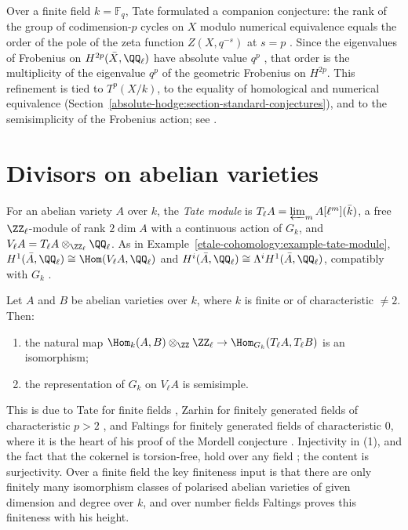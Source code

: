 \begin{remark}\label{absolute-hodge:remark-poles}
Over a finite field $k = \mathbb{F}_q$, Tate formulated a companion conjecture: the rank of the group of codimension-$p$ cycles on $X$ modulo numerical equivalence equals the order of the pole of the zeta
function $Z(X, q^{-s})$ at $s = p$ \cite{tate-1965}. Since the eigenvalues of Frobenius on $H^{2p}(\bar X, \QQ_\ell)$ have absolute value $q^p$ \cite{deligne-weil-1}, that order is the multiplicity of the
eigenvalue $q^p$ of the geometric Frobenius on $H^{2p}$. This refinement is tied to $T^p(X/k)$, to the equality of homological and numerical equivalence (Section~\ref{absolute-hodge:section-standard-conjectures}), and to the
semisimplicity of the Frobenius action; see \cite{totaro-2017}.
\end{remark}

\section{Divisors on abelian varieties}\label{absolute-hodge:section-abelian}

For an abelian variety $A$ over $k$, the \emph{Tate module} is $T_\ell A = \varprojlim_mA[\ell^m](\bar k)$, a free $\ZZ_\ell$-module of rank $2\dim A$ with a continuous action of $G_k$, and
$V_\ell A = T_\ell A \otimes_{\ZZ_\ell}\QQ_\ell$. As in Example~\ref{etale-cohomology:example-tate-module}, $H^1(\bar A, \QQ_\ell) \cong \Hom(V_\ell A, \QQ_\ell)$ and $H^i(\bar A, \QQ_\ell) \cong \Lambda^iH^1(\bar A, \QQ_\ell)$,
compatibly with $G_k$ \cite{milne-etale}.

\begin{theorem}\label{absolute-hodge:theorem-isogeny}
Let $A$ and $B$ be abelian varieties over $k$, where $k$ is finite or of characteristic $\neq 2$. Then:
\begin{enumerate}
\item the natural map $\Hom_k(A, B) \otimes_\ZZ\ZZ_\ell \to \Hom_{G_k}(T_\ell A, T_\ell B)$ is an isomorphism;
\item the representation of $G_k$ on $V_\ell A$ is semisimple.
\end{enumerate}
\end{theorem}

This is due to Tate for finite fields \cite{tate-1966}, Zarhin for finitely generated fields of characteristic $p > 2$ \cite{zarhin-1975}, and Faltings for finitely generated fields of characteristic $0$,
where it is the heart of his proof of the Mordell conjecture \cite{faltings-1983}. Injectivity in (1), and the fact that the cokernel is torsion-free, hold over any field
\cite{mumford-abelian}; the content is surjectivity. Over a finite field the key finiteness input is that there are only finitely many isomorphism classes of polarised abelian varieties of given dimension and
degree over $k$, and over number fields Faltings proves this finiteness with his height.

